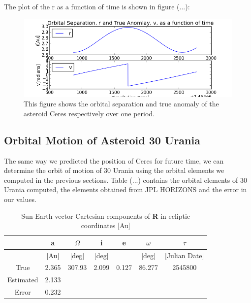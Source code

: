 \documentclass[letterpaper,12pt]{article}
\begin{document}
The plot of the r as a function of time is shown in figure (...):
\FloatBarrier
\begin{figure}[h!]
\centering
\includegraphics[scale=0.7]{figure4.png}
\caption{This figure shows the orbital separation and true anomaly of the asteroid Ceres respectively over one period.}
\end{figure}
\FloatBarrier


\subsection{Orbital Motion of Asteroid 30 Urania}
The same way we predicted the position of Ceres for future time, we can determine the orbit of motion of 30 Urania using the orbital elements we computed in the previous sections. Table (...) contains the orbital elements of 30 Urania computed, the elements obtained from JPL HORIZONS and the error in our values.


\FloatBarrier
\begin{table}[h!]
\caption{Sun-Earth vector Cartesian components of {\bf R} in ecliptic coordinates [Au]} %
\centering %
\begin{tabular}{| c | c | c | c | c | c | c |} %
\hline\hline %
 & a & \begin{math} \Omega \end{math}  & i & e & \begin{math} \omega \end{math}  & \begin{math} \tau \end{math} \\ [0.5ex] %
\hline %
  & [Au]  &  [deg] &[deg] & & [deg] & [Julian Date] \\ \hline 
True & 2.365 & 307.93  &  2.099  & 0.127 &  86.277 & 2545800\\ \hline
Estimated & 2.133 &   &  &   & & \\  \hline
Error & 0.232 &   &     &    & & \\[1ex] %
\hline %
\end{tabular}
\label{table:nonlin} %
\end{table}
\FloatBarrier
\end{document}
